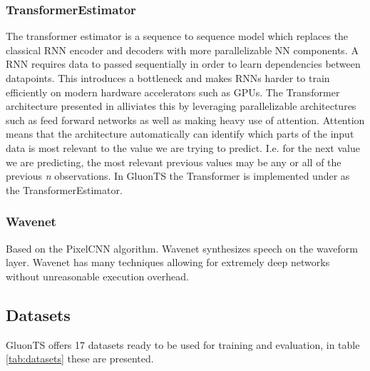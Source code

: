 \subsubsection{TransformerEstimator}
The transformer estimator is a sequence to sequence model which replaces the classical RNN encoder and decoders with more parallelizable NN components. A RNN requires data to passed sequentially in order to learn dependencies between datapoints. This introduces a bottleneck and makes RNNs harder to train efficiently on modern hardware accelerators such as GPUs. The Transformer architecture presented in \cite{vaswani_attention_nodate} alliviates this by leveraging parallelizable architectures such as feed forward networks as well as making heavy use of attention. Attention means that the architecture automatically can identify which parts of the input data is most relevant to the value we are trying to predict\cite{vaswani_attention_nodate}. I.e. for the next value we are predicting, the most relevant previous values may be any or all of the previous \textit{n} observations.  In GluonTS the Transformer is implemented under as the TransformerEstimator. \cite{gluonts-website}

\subsubsection{Wavenet}
Based on the PixelCNN algorithm. Wavenet synthesizes speech on the waveform layer. 
Wavenet has many techniques allowing for extremely deep networks without unreasonable execution overhead. 

\subsection{Datasets}
GluonTS offers 17 datasets ready to be used for training and evaluation, in table \ref{tab:datasets} these are presented.

